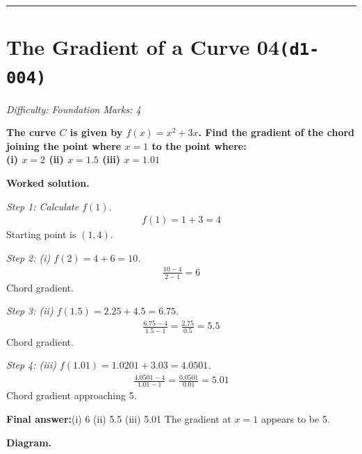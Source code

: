 \documentclass[11pt]{article}
\newcommand{\question}[1]{\par\medskip\noindent\textbf{#1}\par}
\begin{document}
\medskip\hrule

\section*{The Gradient of a Curve 04\quad\small\texttt{(d1-004)}}
\textit{Difficulty: Foundation \quad\textbar\quad Marks: 4}

\question{The curve \( C \) is given by \( f(x) = x^2 + 3x \). Find the gradient of the chord joining the point where \( x = 1 \) to the point where:\\[3pt]  (i) \( x = 2 \) \quad  (ii) \( x = 1.5 \) \quad  (iii) \( x = 1.01 \)}

\textbf{Worked solution.}

\textit{Step 1: Calculate \( f(1) \).}
\[\begin{gathered}
f(1) = 1 + 3 = 4
\end{gathered}\]
Starting point is \( (1, 4) \).

\textit{Step 2: (i) \( f(2) = 4 + 6 = 10 \).}
\[\begin{gathered}
\frac{10 - 4}{2 - 1} = 6
\end{gathered}\]
Chord gradient.

\textit{Step 3: (ii) \( f(1.5) = 2.25 + 4.5 = 6.75 \).}
\[\begin{gathered}
\frac{6.75 - 4}{1.5 - 1} = \frac{2.75}{0.5} = 5.5
\end{gathered}\]
Chord gradient.

\textit{Step 4: (iii) \( f(1.01) = 1.0201 + 3.03 = 4.0501 \).}
\[\begin{gathered}
\frac{4.0501 - 4}{1.01 - 1} = \frac{0.0501}{0.01} = 5.01
\end{gathered}\]
Chord gradient approaching 5.

\begin{answerbox}
\textbf{Final answer:}\quad (i) 6 \quad  (ii) 5.5 \quad  (iii) 5.01 \quad  The gradient at \(\displaystyle  x = 1 \) appears to be 5.
\end{answerbox}
\textbf{Diagram.}
\end{document}

